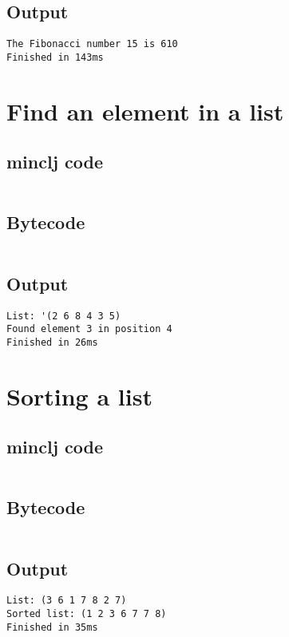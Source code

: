 \documentclass[11pt]{scrreprt}
\begin{document}
\subsection{Output}
\begin{verbatim}
The Fibonacci number 15 is 610
Finished in 143ms
\end{verbatim}


\section{Find an element in a list}
\subsection{minclj code}
\inputminted{clojure}{/home/mario/git/MarioJim/miniclj/examples/find_in_list.clj}

\subsection{Bytecode}
\inputminted{text}{/home/mario/git/MarioJim/miniclj/examples/find_in_list.mclj}

\subsection{Output}
\begin{verbatim}
List: '(2 6 8 4 3 5)
Found element 3 in position 4
Finished in 26ms
\end{verbatim}

\section{Sorting a list}
\subsection{minclj code}
\inputminted{clojure}{/home/mario/git/MarioJim/miniclj/examples/sort_list.clj}

\subsection{Bytecode}
\inputminted{text}{/home/mario/git/MarioJim/miniclj/examples/sort_list.mclj}

\subsection{Output}
\begin{verbatim}
List: (3 6 1 7 8 2 7)
Sorted list: (1 2 3 6 7 7 8)
Finished in 35ms
\end{verbatim}
\end{document}
